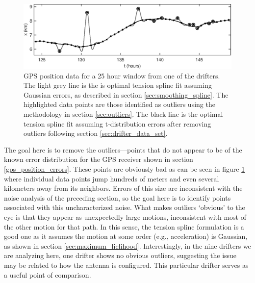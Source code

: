 \documentclass[10pt,journal]{IEEEtran}
\begin{document}
\begin{figure}[t]
  \centerline{\includegraphics[width=39pc,angle=0]{figures/gpsfit}}
  
  \caption{GPS position data for a 25 hour window from one of the drifters. The light grey line is the is optimal tension spline fit assuming Gaussian errors, as described in section \ref{sec:smoothing_spline}. The highlighted data points are those identified as outliers using the methodology in section \ref{sec:outliers}. The black line is the optimal tension spline fit assuming t-distribution errors after removing outliers following section \ref{sec:drifter_data_set}.}
  \label{gpsfit}
\end{figure}

The goal here is to remove the outliers---points that do not appear to be of the known error distribution for the GPS receiver shown in section \ref{gps_position_errors}. These points are obviously bad as can be seen in figure \ref{gpsfit} where individual data points jump hundreds of meters and even several kilometers away from its neighbors. Errors of this size are inconsistent with the noise analysis of the preceding section, so the goal here is to identify points associated with this uncharacterized noise. What makes outliers `obvious' to the eye is that they appear as unexpectedly large motions, inconsistent with most of the other motion for that path. In this sense, the tension spline formulation is a good one as it assumes the motion at some order (e.g., acceleration) is Gaussian, as shown in section \ref{sec:maximum_lielihood}. Interestingly, in the nine drifters we are analyzing here, one drifter shows no obvious outliers, suggesting the issue may be related to how the antenna is configured. This particular drifter serves as a useful point of comparison.
\end{document}
